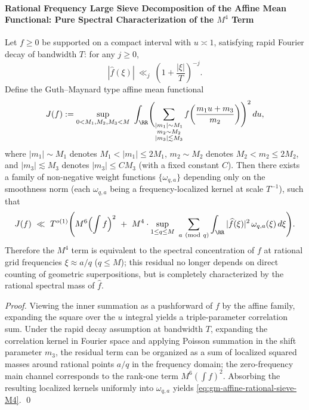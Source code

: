 \paragraph{Rational Frequency Large Sieve Decomposition of the Affine Mean Functional: Pure Spectral Characterization of the \texorpdfstring{$M^4$}{M4} Term}
\begin{theorem}\label{thm:gm-affine-rational-sieve-M4}
Let \(f\ge 0\) be supported on a compact interval with \(u\asymp 1\), satisfying rapid Fourier decay of bandwidth \(T\): for any \(j\ge 0\),
\[
|\widehat f(\xi)|\ \ll_j\ \left(1+\frac{|\xi|}{T}\right)^{-j}.
\]
Define the Guth--Maynard type affine mean functional
\[
J(f)
:=\sup_{0<M_1,M_2,M_3<M}\ \int_{\RR}
\Biggl(\sum_{\substack{|m_1|\sim M_1\\ m_2\sim M_2\\ |m_3|\lesssim M_3}}
f\!\left(\frac{m_1u+m_3}{m_2}\right)\Biggr)^2\,du,
\]
where \(|m_1|\sim M_1\) denotes \(M_1<|m_1|\le 2M_1\), \(m_2\sim M_2\) denotes \(M_2<m_2\le 2M_2\), and \(|m_3|\lesssim M_3\) denotes \(|m_3|\le C M_3\) (with a fixed constant \(C\)).
Then there exists a family of non-negative weight functions \(\{\omega_{q,a}\}\) depending only on the smoothness norm (each \(\omega_{q,a}\) being a frequency-localized kernel at scale \(T^{-1}\)), such that
\begin{equation}\label{eq:gm-affine-rational-sieve-M4}
J(f)\ \ll\ T^{o(1)}
\Biggl(
M^6\Bigl(\int f\Bigr)^2
\ +\
M^4\cdot \sup_{1\le q\le M}\ \sum_{a\ (\mathrm{mod}\ q)}
\int_{\RR} |\widehat f(\xi)|^2\,\omega_{q,a}(\xi)\,d\xi
\Biggr).
\end{equation}
Therefore the \(M^4\) term is equivalent to the spectral concentration of \(f\) at rational grid frequencies \(\xi\approx a/q\) (\(q\le M\)); this residual no longer depends on direct counting of geometric superpositions, but is completely characterized by the rational spectral mass of \(\widehat f\).
\end{theorem}

\begin{proof}
Viewing the inner summation as a pushforward of \(f\) by the affine family, expanding the square over the \(u\) integral yields a triple-parameter correlation sum.
Under the rapid decay assumption at bandwidth \(T\), expanding the correlation kernel in Fourier space and applying Poisson summation in the shift parameter \(m_3\), the residual term can be organized as a sum of localized squared masses around rational points \(a/q\) in the frequency domain; the zero-frequency main channel corresponds to the rank-one term \(M^6(\int f)^2\).
Absorbing the resulting localized kernels uniformly into \(\omega_{q,a}\) yields \eqref{eq:gm-affine-rational-sieve-M4}. \qed
\end{proof}

